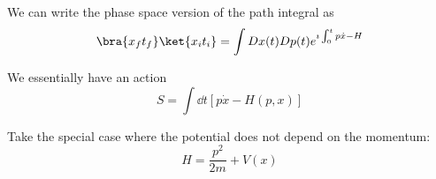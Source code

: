 \documentclass[a4paper,twoside,master.tex]{subfiles}
\begin{document}

We can write the phase space version of the path integral as
\begin{equation}
    \bra{x_f t_f}\ket{x_i t_i} = \int D x(t) D p(t) e^{\imath \int_0^t p\dot{x} - H}
\end{equation}

We essentially have an action
\begin{equation}
    S = \int \dd{t} \left[ p\dot{x} - H(p,x) \right]
\end{equation}

Take the special case where the potential does not depend on the momentum:
\begin{equation}
    H = \frac{p^2}{2m} + V(x)
\end{equation}
\end{document}
